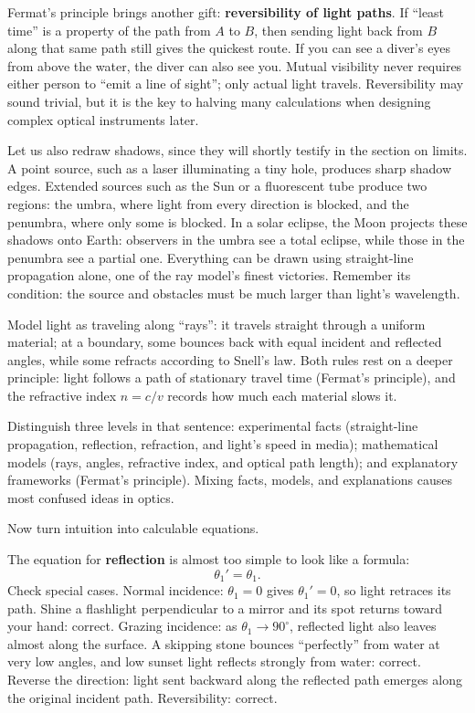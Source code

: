 Fermat's principle brings another gift: \textbf{reversibility of light paths}. If ``least time'' is a property of the path from \(A\) to \(B\), then sending light back from \(B\) along that same path still gives the quickest route. If you can see a diver's eyes from above the water, the diver can also see you. Mutual visibility never requires either person to ``emit a line of sight''; only actual light travels. Reversibility may sound trivial, but it is the key to halving many calculations when designing complex optical instruments later.

Let us also redraw shadows, since they will shortly testify in the section on limits. A point source, such as a laser illuminating a tiny hole, produces sharp shadow edges. Extended sources such as the Sun or a fluorescent tube produce two regions: the umbra, where light from every direction is blocked, and the penumbra, where only some is blocked. In a solar eclipse, the Moon projects these shadows onto Earth: observers in the umbra see a total eclipse, while those in the penumbra see a partial one. Everything can be drawn using straight-line propagation alone, one of the ray model's finest victories. Remember its condition: the source and obstacles must be much larger than light's wavelength.


\begin{oneline}
Model light as traveling along ``rays'': it travels straight through a uniform material; at a boundary, some bounces back with equal incident and reflected angles, while some refracts according to Snell's law. Both rules rest on a deeper principle: light follows a path of stationary travel time (Fermat's principle), and the refractive index \(n=c/v\) records how much each material slows it.
\end{oneline}

Distinguish three levels in that sentence: experimental facts (straight-line propagation, reflection, refraction, and light's speed in media); mathematical models (rays, angles, refractive index, and optical path length); and explanatory frameworks (Fermat's principle). Mixing facts, models, and explanations causes most confused ideas in optics.


Now turn intuition into calculable equations.

The equation for \textbf{reflection} is almost too simple to look like a formula:
\[
\theta_1'=\theta_1 .
\]
Check special cases. Normal incidence: \(\theta_1=0\) gives \(\theta_1'=0\), so light retraces its path. Shine a flashlight perpendicular to a mirror and its spot returns toward your hand: correct. Grazing incidence: as \(\theta_1\to 90^\circ\), reflected light also leaves almost along the surface. A skipping stone bounces ``perfectly'' from water at very low angles, and low sunset light reflects strongly from water: correct. Reverse the direction: light sent backward along the reflected path emerges along the original incident path. Reversibility: correct.

